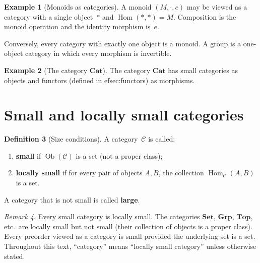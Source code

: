 \documentclass[a4paper,12pt]{book}
\DeclareMathOperator{\Hom}{Hom}
\DeclareMathOperator{\Ob}{Ob}
\newcommand{\Set}{\mathbf{Set}}
\newcommand{\Grp}{\mathbf{Grp}}
\newcommand{\Top}{\mathbf{Top}}
\newcommand{\Cat}{\mathbf{Cat}}
\theoremstyle{definition}
\newtheorem{definition}{Definition}[section]
\newtheorem{example}[definition]{Example}
\theoremstyle{plain}
\theoremstyle{remark}
\newtheorem{remark}[definition]{Remark}
\begin{document}
\begin{example}[Monoids as categories]\label{ex:monoid-cat}
A monoid $(M,\cdot,e)$ may be viewed as a category with a single
object~$\ast$ and $\Hom(\ast,\ast)=M$.
Composition is the monoid operation and the identity morphism is~$e$.

Conversely, every category with exactly one object is a monoid.
A group is a one-object category in which every morphism is invertible.
\end{example}

\begin{example}[The category $\Cat$]\label{ex:cat-of-cats}
\index{category!Cat@$\Cat$}
The category $\Cat$ has small categories as objects and functors
(defined in 
ef{sec:functors}) as morphisms.
\end{example}


\section{Small and locally small categories}\label{sec:size}

\begin{definition}[Size conditions]\label{def:size}
A category~$\mathcal{C}$ is called:
\begin{enumerate}[label=(\roman*)]
    \item \textbf{small} if $\Ob(\mathcal{C})$ is a set
          (not a proper class);
    \item \textbf{locally small} if for every pair of objects
          $A,B$, the collection $\Hom_\mathcal{C}(A,B)$ is a set.
\end{enumerate}
A category that is not small is called \textbf{large}.
\end{definition}

\begin{remark}\label{rem:size-remarks}
Every small category is locally small.
The categories $\Set$, $\Grp$, $\Top$, etc.\ are locally small but not
small (their collection of objects is a proper class).
Every preorder viewed as a category is small provided the underlying
set is a set.
Throughout this text, ``category'' means ``locally small category''
unless otherwise stated.
\end{remark}
\end{document}

